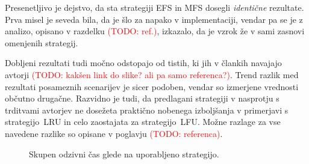 \documentclass[a4paper, 12pt]{book}
\newcommand{\TODO}[1]{\textcolor{red}{(TODO: #1)}}
\begin{document}
Presenetljivo je dejstvo, da sta strategiji EFS in MFS dosegli
\textit{identične} rezultate. Prva misel je seveda bila, da je šlo za napako v
implementaciji, vendar pa se je z analizo, opisano v razdelku \TODO{ref.},
izkazalo, da je vzrok že v sami zasnovi omenjenih strategij.

Dobljeni rezultati tudi močno odstopajo od tistih, ki jih v člankih
navajajo avtorji \TODO{kakšen link do slike? ali pa samo referenca?}.
Trend razlik med rezultati posameznih scenarijev je sicer podoben, vendar so
izmerjene vrednosti občutno drugačne. Razvidno je tudi, da predlagani
strategiji v nasprotju s trditvami avtorjev ne dosežeta praktično nobenega
izboljšanja v primerjavi s strategijo~LRU in celo zaostajata za
strategijo~LFU. Možne razlage za vse navedene razlike so opisane v
poglavju \TODO{referenca}.

\begin{figure}

\caption{Skupen odzivni čas glede na uporabljeno strategijo.}
\label{hist_rsp_t}
\end{figure}
\end{document}

